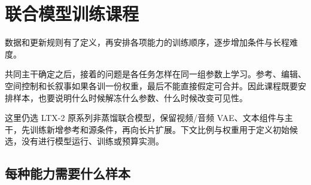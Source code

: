 \chapter{联合模型训练课程}\label{seedance-m20}

数据和更新规则有了定义，再安排各项能力的训练顺序，逐步增加条件与长程难度。

共同主干确定之后，接着的问题是各任务怎样在同一组参数上学习。参考、编辑、空间控制和长叙事如果各训一份权重，最后不能直接假定可合并。因此课程既要安排样本，也要说明什么时候解冻什么参数、什么时候改变可见性。

这里仍选 LTX-2 原系列非蒸馏联合模型，保留视频/音频 VAE、文本组件与主干，先训练新增参考和源条件，再向长片扩展。下文比例与权重用于定义初始候选，没有进行模型运行、训练或预算实测。

\section{每种能力需要什么样本}\label{seedance-m20-ux6bcfux79cdux80fdux529bux9700ux8981ux4ec0ux4e48ux6837ux672c}

